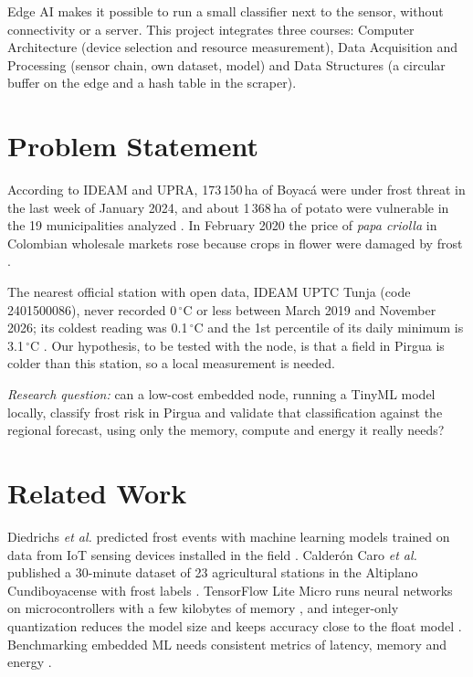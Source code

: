 \documentclass[conference]{IEEEtran}
\begin{document}
Edge AI makes it possible to run a small classifier next to the sensor, without connectivity or a server. This project integrates three courses: Computer Architecture (device selection and resource measurement), Data Acquisition and Processing (sensor chain, own dataset, model) and Data Structures (a circular buffer on the edge and a hash table in the scraper).

\section{Problem Statement}
According to IDEAM and UPRA, 173\,150\,ha of Boyac\'a were under frost threat in the last week of January 2024, and about 1\,368\,ha of potato were vulnerable in the 19 municipalities analyzed \cite{upra2024}. In February 2020 the price of \textit{papa criolla} in Colombian wholesale markets rose because crops in flower were damaged by frost \cite{dane2020}.

The nearest official station with open data, IDEAM UPTC Tunja (code 2401500086), never recorded 0\,$^\circ$C or less between March 2019 and November 2026; its coldest reading was 0.1\,$^\circ$C and the 1st percentile of its daily minimum is 3.1\,$^\circ$C \cite{ideam_data}. Our hypothesis, to be tested with the node, is that a field in Pirgua is colder than this station, so a local measurement is needed.

\textit{Research question:} can a low-cost embedded node, running a TinyML model locally, classify frost risk in Pirgua and validate that classification against the regional forecast, using only the memory, compute and energy it really needs?

\section{Related Work}
Diedrichs \textit{et al.} predicted frost events with machine learning models trained on data from IoT sensing devices installed in the field \cite{diedrichs2018}. Calder\'on Caro \textit{et al.} published a 30-minute dataset of 23 agricultural stations in the Altiplano Cundiboyacense with frost labels \cite{calderon2026,zenodo2026}. TensorFlow Lite Micro runs neural networks on microcontrollers with a few kilobytes of memory \cite{david2021}, and integer-only quantization reduces the model size and keeps accuracy close to the float model \cite{jacob2018}. Benchmarking embedded ML needs consistent metrics of latency, memory and energy \cite{banbury2020}.
\end{document}
